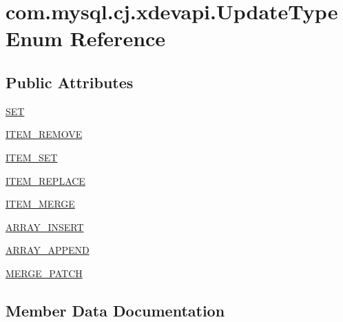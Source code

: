 \hypertarget{enumcom_1_1mysql_1_1cj_1_1xdevapi_1_1_update_type}{}\section{com.\+mysql.\+cj.\+xdevapi.\+Update\+Type Enum Reference}
\label{enumcom_1_1mysql_1_1cj_1_1xdevapi_1_1_update_type}
\subsection*{Public Attributes}
\begin{DoxyCompactItemize}
\item 
\mbox{\hyperlink{enumcom_1_1mysql_1_1cj_1_1xdevapi_1_1_update_type_a5b66ffe275997597cef8611505174045}{S\+ET}}
\item 
\mbox{\hyperlink{enumcom_1_1mysql_1_1cj_1_1xdevapi_1_1_update_type_a92ffa005c85171613bd269273c59fd83}{I\+T\+E\+M\+\_\+\+R\+E\+M\+O\+VE}}
\item 
\mbox{\hyperlink{enumcom_1_1mysql_1_1cj_1_1xdevapi_1_1_update_type_a9f4eaaf18702cab9db7f6200324a638d}{I\+T\+E\+M\+\_\+\+S\+ET}}
\item 
\mbox{\hyperlink{enumcom_1_1mysql_1_1cj_1_1xdevapi_1_1_update_type_a86b9729e2e664a76b71ceb75e0bf042c}{I\+T\+E\+M\+\_\+\+R\+E\+P\+L\+A\+CE}}
\item 
\mbox{\hyperlink{enumcom_1_1mysql_1_1cj_1_1xdevapi_1_1_update_type_ab1ba8af34e767d5a9fd837dea8e028f2}{I\+T\+E\+M\+\_\+\+M\+E\+R\+GE}}
\item 
\mbox{\hyperlink{enumcom_1_1mysql_1_1cj_1_1xdevapi_1_1_update_type_a1dd689d9bbaf2c59c90350397c70020b}{A\+R\+R\+A\+Y\+\_\+\+I\+N\+S\+E\+RT}}
\item 
\mbox{\hyperlink{enumcom_1_1mysql_1_1cj_1_1xdevapi_1_1_update_type_acf977f34fa31536646290aec771d1ec7}{A\+R\+R\+A\+Y\+\_\+\+A\+P\+P\+E\+ND}}
\item 
\mbox{\hyperlink{enumcom_1_1mysql_1_1cj_1_1xdevapi_1_1_update_type_ad254a3ff874e2ba2541c17d96823ba7a}{M\+E\+R\+G\+E\+\_\+\+P\+A\+T\+CH}}
\end{DoxyCompactItemize}


\subsection{Member Data Documentation}
\mbox{\label{enumcom_1_1mysql_1_1cj_1_1xdevapi_1_1_update_type_acf977f34fa31536646290aec771d1ec7}} 
